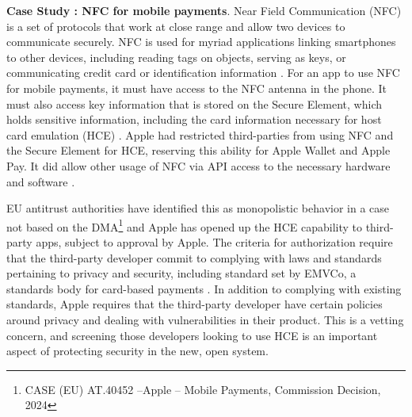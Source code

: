 \documentclass[letterpaper,twocolumn,10pt]{article}
\newcommand{\subh}[1]{\smallskip \noindent \textbf{{#1}}.}
\renewcommand{\paragraph}[1]{\subh{#1}}
\begin{document}
\paragraph{Case Study \thecasestudy: NFC for mobile payments}
Near Field Communication (NFC) is a set of protocols that work at close range and allow two devices to communicate securely.  NFC is used for myriad applications linking smartphones to other devices, including reading tags on objects, serving as keys, or communicating credit card or identification information \cite{apple_security}. For an app to use NFC for mobile payments, it must have access to the NFC antenna in the phone. It must also access key information that is stored on the Secure Element, which holds sensitive information, including the card information necessary for host card emulation (HCE) \cite{apple_se}.  Apple had restricted third-parties from using NFC and the Secure Element for HCE, reserving this ability for Apple Wallet and Apple Pay. It did allow other usage of NFC via API access to the necessary hardware and software \cite{apple_hce}. 

EU antitrust authorities have identified this as monopolistic behavior in a case not based on the DMA\footnote{CASE (EU) AT.40452 –Apple – Mobile
Payments, Commission Decision, 2024 
} and Apple has opened up the HCE capability to third-party apps, subject to approval by Apple. The criteria for authorization require that the third-party developer commit to complying with laws and standards pertaining to privacy and security, including standard set by EMVCo, a standards body for card-based payments \cite{apple_hce}.  In addition to complying with existing standards, Apple requires that the third-party developer have certain policies around privacy and dealing with vulnerabilities in their product\cite{apple_hce}. This is a vetting concern, and screening those developers looking to use HCE is an important aspect of protecting security in the new, open system.
\end{document}
